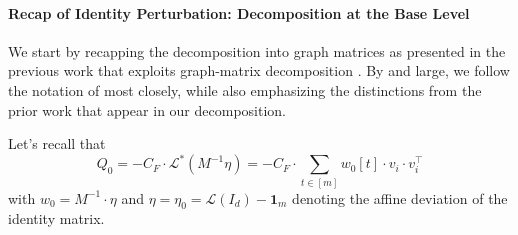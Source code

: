 \documentclass[12pt]{article}
\def \al {\alpha}
\def\1{\bm{1}}
\newcommand{\calR}{\mathcal{R}}
\newcommand\numberthis{\addtocounter{equation}{1}\tag{\theequation}}
\newcommand{\todo}[1]{\textcolor{red}{(#1)}}
\newcommand{\calL}{\mathcal{L}}
\begin{document}
\paragraph{Recap of Identity Perturbation: Decomposition at the Base Level}
We start by recapping the decomposition into graph matrices as presented in the previous work that exploits graph-matrix decomposition \cite{PTVW22, HKPX23}. By and large, we follow the notation of \cite{HKPX23} most closely, while also emphasizing the distinctions from the prior work that appear in our decomposition.

Let's recall that \[ 
Q_0 = -C_F \cdot  \mathcal{L}^*(M^{-1}\eta)= - C_F \cdot \sum_{t\in [m]} w_0[t] \cdot v_i \cdot v_i^\top
\]
with \( w_0 = M^{-1} \cdot \eta  \) and \(\eta = \eta_0 =   \calL(I_d) -\1_m\) denoting the affine deviation of the identity matrix.
\end{document}
